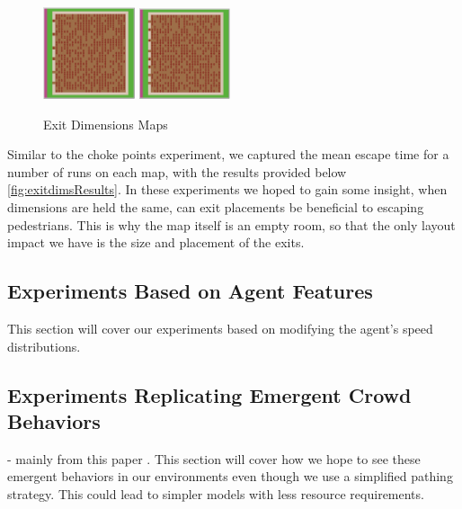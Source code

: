 \documentclass[12pt,letterpaper]{article}
\begin{document}
\begin{figure}[ht]
\begin{minipage}[b]{.75\linewidth}
    \includegraphics[width=0.24\textwidth]{./figures/exit_dims_6_c.png}
    \includegraphics[width=0.24\textwidth]{./figures/exit_dims_8_c.png}
  \end{minipage}

  \caption{Exit Dimensions Maps}
\end{figure}

Similar to the choke points experiment, we captured the mean escape time for a number of runs on each map, with the results provided below \ref{fig:exitdimsResults}.  In these experiments we hoped to gain some insight, when dimensions are held the same, can exit placements be beneficial to escaping pedestrians.  This is why the map itself is an empty room, so that the only layout impact we have is the size and placement of the exits.
\subsection{Experiments Based on Agent Features} \label{expAgent}

This section will cover our experiments based on modifying the agent's speed distributions.


\subsection{Experiments Replicating Emergent Crowd Behaviors} \label{emergentBehavior}
- mainly from this paper \cite{almeidaCrowdSimulationModeling2013}  .  This section will cover how we hope to see these emergent behaviors in our environments even though we use a simplified pathing strategy.  This could lead to simpler models with less resource requirements.
\end{document}
